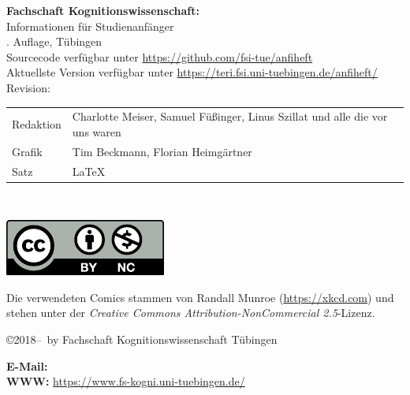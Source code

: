 \thispagestyle{empty}

\textbf{Fachschaft Kognitionswissenschaft:}\\
Informationen für Studienanfänger\\
\number\auflage. Auf\/lage, Tübingen \number\jahr\\[0.2cm]
{\footnotesize Sourcecode verfügbar unter \url{https://github.com/fsi-tue/anfiheft}\\
               Aktuellste Version verfügbar unter \url{https://teri.fsi.uni-tuebingen.de/anfiheft/}\\
	       Revision: \gitCommit\\[1cm]}


\begin{tabular}{ll}
	Redaktion & Charlotte Meiser, Samuel Füßinger, Linus Szillat und alle die vor uns waren \\ %
	Grafik & Tim Beckmann, Florian Heimgärtner \\
	Satz & \LaTeX
\end{tabular}\\

\vfill
\begin{minipage}[c]{0.1\textwidth}
	\includegraphics[width=\linewidth]{kogni/logos/by-nc.pdf}
\end{minipage}
\begin{minipage}[c]{0.9\textwidth}
	Die verwendeten Comics stammen von Randall Munroe (\url{https://xkcd.com}) und stehen unter der \emph{Creative Commons Attribution-NonCommercial 2.5}-Lizenz.
\end{minipage}

\copyright 2018--\number\jahr~by Fachschaft Kognitionswissenschaft Tübingen\\

\medskip

\textbf{E-Mail:} \hfill
{}\\
\textbf{WWW:} \hfill
\url{https://www.fs-kogni.uni-tuebingen.de/}
\newpage
